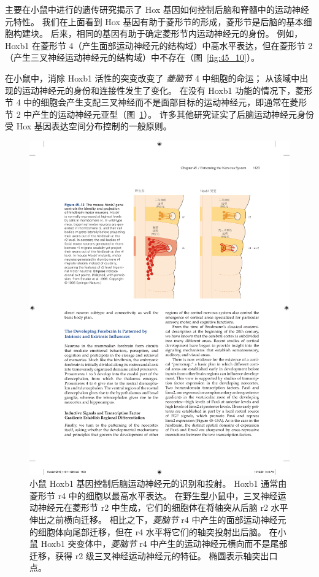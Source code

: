 主要在小鼠中进行的遗传研究揭示了 Hox 基因如何控制后脑和脊髓中的运动神经元特性。
我们在上面看到 Hox 基因有助于菱形节的形成，菱形节是后脑的基本细胞构建块。
后来，相同的基因有助于确定菱形节内运动神经元的身份。
例如，Hoxb1 在菱形节 4（产生面部运动神经元的结构域）中高水平表达，但在菱形节 2（产生三叉神经运动神经元的结构域）中不存在（图~\ref{fig:45_10}）。


在小鼠中，消除 Hoxb1 活性的突变改变了 \textit{菱脑节} 4 中细胞的命运；
从该域中出现的运动神经元的身份和连接性发生了变化。 
在没有 Hoxb1 功能的情况下，菱形节 4 中的细胞会产生支配三叉神经而不是面部目标的运动神经元，即通常在菱形节 2 中产生的运动神经元亚型（图~\ref{fig:45_12}）。
许多其他研究证实了后脑运动神经元身份受 Hox 基因表达空间分布控制的一般原则。


\begin{figure}[htbp]
	\centering
	\includegraphics[width=0.79\linewidth]{chap45/fig_45_12}
	\caption{小鼠 Hoxb1 基因控制后脑运动神经元的识别和投射。
		Hoxb1 通常由菱形节 r4 中的细胞以最高水平表达。
		在野生型小鼠中，三叉神经运动神经元在菱形节 r2 中生成，它们的细胞体在将轴突从后脑 r2 水平伸出之前横向迁移。
		相比之下，\textit{菱脑节} r4 中产生的面部运动神经元的细胞体向尾部迁移，但在 r4 水平将它们的轴突投射出后脑。
		在小鼠 Hoxb1 突变体中，\textit{菱脑节} r4 中产生的运动神经元横向而不是尾部迁移，获得 r2 级三叉神经运动神经元的特征。
		椭圆表示轴突出口点\cite{studer1996altered}。}
	\label{fig:45_12}
\end{figure}


